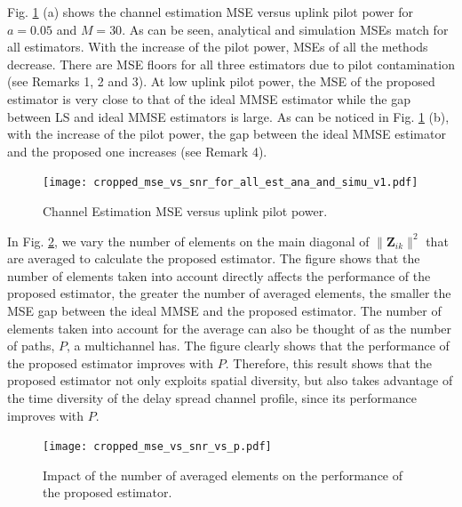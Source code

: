 \documentclass[journal,12pt,onecolumn]{IEEEtran}
\begin{document}
Fig. \ref{fig:snr_vs_mse} (a) shows the channel estimation MSE versus uplink pilot power for $a = 0.05$ and $M = 30$. As can be seen, analytical and simulation MSEs match for all estimators. With the increase of the pilot power, MSEs of all the methods decrease. There are MSE floors for all three estimators due to pilot contamination (see Remarks 1, 2 and 3). At low uplink pilot power, the MSE of the proposed estimator is very close to that of the ideal MMSE estimator while the gap between LS and ideal MMSE estimators is large. As can be noticed in Fig. \ref{fig:snr_vs_mse} (b), with the increase of the pilot power, the gap between the ideal MMSE estimator and the proposed one increases (see Remark 4).

\begin{figure}[b]
\vspace{-5mm}
\centering
\texttt{[image: cropped\_mse\_vs\_snr\_for\_all\_est\_ana\_and\_simu\_v1.pdf]}
\caption{Channel Estimation MSE versus uplink pilot power.}
\label{fig:snr_vs_mse}
\end{figure}

In Fig. \ref{fig:snr_vs_mse_vs_avg}, we vary the number of elements on the main diagonal of $\lVert \textbf{Z}_{ik} \rVert^{2}$ that are averaged to calculate the proposed estimator. The figure shows that the number of elements taken into account directly affects the performance of the proposed estimator, the greater the number of averaged elements, the smaller the MSE gap between the ideal MMSE and the proposed estimator. The number of elements taken into account for the average can also be thought of as the number of paths, $P$, a multichannel has. The figure clearly shows that the performance of the proposed estimator improves with $P$. Therefore, this result shows that the proposed estimator not only exploits spatial diversity, but also takes advantage of the time diversity of the delay spread channel profile, since its performance improves with $P$.

\begin{figure}[t]
\centering
\texttt{[image: cropped\_mse\_vs\_snr\_vs\_p.pdf]}
\caption{Impact of the number of averaged elements on the performance of the proposed estimator.}
\label{fig:snr_vs_mse_vs_avg}
\vspace{-4mm}
\end{figure}
\end{document}
